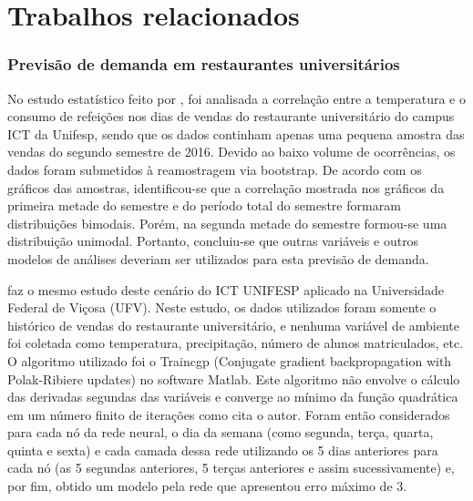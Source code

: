 \documentclass[	12pt, Times, openright, twoside, a4paper, english, brazil]{abntex2}
\begin{document}
  \chapter{Trabalhos relacionados}
    \subsection{Previsão de demanda em restaurantes universitários}
         No estudo estatístico feito por \cite{Landim2016}, foi analisada a correlação entre a temperatura e o consumo de refeições nos dias de vendas do restaurante universitário do campus ICT da Unifesp, sendo que os dados continham apenas uma pequena amostra das vendas do segundo semestre de 2016. Devido ao baixo volume de ocorrências, os dados foram submetidos à reamostragem via bootstrap. De acordo com os gráficos das amostras, identificou-se que a correlação mostrada nos gráficos da primeira metade do semestre e do período total do semestre formaram distribuições bimodais. Porém, na segunda metade do semestre formou-se uma distribuição unimodal. Portanto, concluiu-se que outras variáveis e outros modelos de análises deveriam ser utilizados para esta previsão de demanda.
        
         \cite{Lopes2008} faz o mesmo estudo deste cenário do ICT UNIFESP aplicado na Universidade Federal de Viçosa (UFV). Neste estudo, os dados utilizados foram somente o histórico de vendas do restaurante universitário, e nenhuma variável de ambiente foi coletada como temperatura, precipitação, número de alunos matriculados, etc. O algoritmo utilizado foi o Traincgp (Conjugate gradient backpropagation with Polak-Ribiere updates) no software Matlab. Este algoritmo não envolve o cálculo das derivadas segundas das variáveis e converge ao mínimo da função quadrática em um número finito de iterações como cita o autor. Foram então considerados para cada nó da rede neural, o dia da semana (como segunda, terça, quarta, quinta e sexta) e cada camada dessa rede utilizando os 5 dias anteriores para cada nó (as 5 segundas anteriores, 5 terças anteriores e assim sucessivamente) e, por fim, obtido um modelo pela rede que apresentou erro máximo de 3.
        
\end{document}
